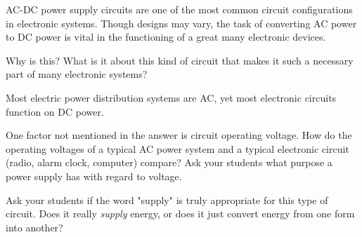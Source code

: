 

AC-DC power supply circuits are one of the most common circuit configurations in electronic systems.  Though designs may vary, the task of converting AC power to DC power is vital in the functioning of a great many electronic devices.

Why is this?  What is it about this kind of circuit that makes it such a necessary part of many electronic systems?







Most electric power distribution systems are AC, yet most electronic circuits function on DC power.







One factor not mentioned in the answer is circuit operating voltage.  How do the operating voltages of a typical AC power system and a typical electronic circuit (radio, alarm clock, computer) compare?  Ask your students what purpose a power supply has with regard to voltage.

Ask your students if the word "supply" is truly appropriate for this type of circuit.  Does it really {\it supply} energy, or does it just convert energy from one form into another?




